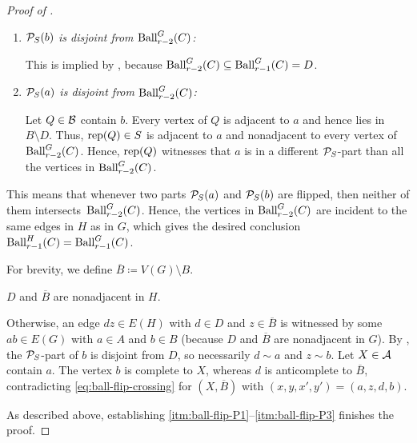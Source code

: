 \begin{proof}[Proof of ]
\begin{claimproof}
    \begin{enumerate}
    \item \emph{$\PP_S(b)$ is disjoint from $\Ball_{r-2}^G(C)$:}
        
    This is implied by , because $\Ball_{r-2}^G(C) \subseteq \Ball_{r-1}^G(C) =D$.

    \item \emph{$\PP_S(a)$ is disjoint from $\Ball_{r-2}^G(C)$:}

    Let $Q\in\BB$ contain $b$.
    Every vertex of $Q$ is adjacent to $a$ and hence lies in $B\setminus D$.
    Thus, $\rep(Q)\in S$ is adjacent to $a$ and nonadjacent to every vertex of $\Ball_{r-2}^G(C)$.
    Hence, $\rep(Q)$ witnesses that $a$ is in a different $\PP_S$-part than all the vertices in $\Ball_{r-2}^G(C)$. 
    \end{enumerate}

    This means that whenever two parts $\PP_S(a)$ and $\PP_S(b)$ are flipped, then neither of them intersects~$\Ball_{r-2}^G(C)$.
    Hence, the vertices in $\Ball_{r-2}^G(C)$ are incident to the same edges in $H$ as in $G$, which gives the desired conclusion 
    $\Ball_{r-1}^H(C) = \Ball_{r-1}^G(C)$.
    \end{claimproof}

    For brevity, we define $\overline B\coloneqq V(G)\setminus B$.

    \begin{claim}[\ref{itm:ball-flip-P3}]\label{clm:ball-flip-P3}
        $D$ and $\overline B$ are nonadjacent in $H$.
    \end{claim}

    \begin{claimproof}
            Otherwise, an edge $dz\in E(H)$ with $d \in D$ and $z \in \overline B$ is witnessed by some $ab\in E(G)$ with $a \in A$ and $b \in B$ (because $D$ and $\overline B$ are nonadjacent in $G$).
    By , the $\PP_S$-part of $b$ is disjoint from $D$, so necessarily $d\sim a$ and $z\sim b$.
    Let $X\in\AA$ contain $a$.
    The vertex $b$ is complete to $X$, whereas $d$ is anticomplete to $\overline B$, contradicting \eqref{eq:ball-flip-crossing} for $(X,\overline B)$ with $(x,y,x',y')=(a,z,d,b)$.
    \end{claimproof}
    As described above, establishing \ref{itm:ball-flip-P1}--\ref{itm:ball-flip-P3} finishes the proof.
\end{proof}

